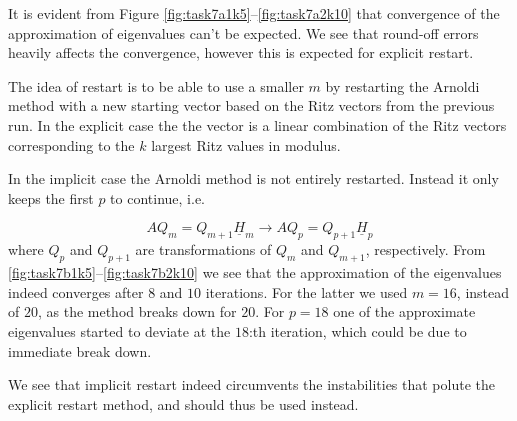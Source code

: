 

It is evident from Figure \ref{fig:task7a1k5}--\ref{fig:task7a2k10} that convergence of the approximation of eigenvalues can't be expected. We see that round-off errors heavily affects the convergence, however this is expected for explicit restart.

The idea of restart is to be able to use a smaller $m$ by restarting the Arnoldi method with a new starting vector based on the Ritz vectors from the previous run. In the explicit case the the vector is a linear combination of the Ritz vectors corresponding to the $k$ largest Ritz values in modulus.

In the implicit case the Arnoldi method is not entirely restarted. Instead it only keeps the first $p$ to continue, i.e.

\begin{equation*}
  A Q_{m} = Q_{m+1} \underline{H}_{m} \rightarrow A Q_{p} = Q_{p+1} \underline{H}_{p}
\end{equation*}
where $Q_{p}$ and $Q_{p+1}$ are transformations of $Q_{m}$ and $Q_{m+1}$, respectively.
From \ref{fig:task7b1k5}--\ref{fig:task7b2k10} we see that the approximation of the eigenvalues indeed converges after $8$ and $10$ iterations. For the latter we used $m = 16$, instead of $20$, as the method breaks down for $20$. For $p = 18$ one of the approximate eigenvalues started to deviate at the $18$:th iteration, which could be due to immediate break down.

We see that implicit restart indeed circumvents the instabilities that polute the explicit restart method, and should thus be used instead.

